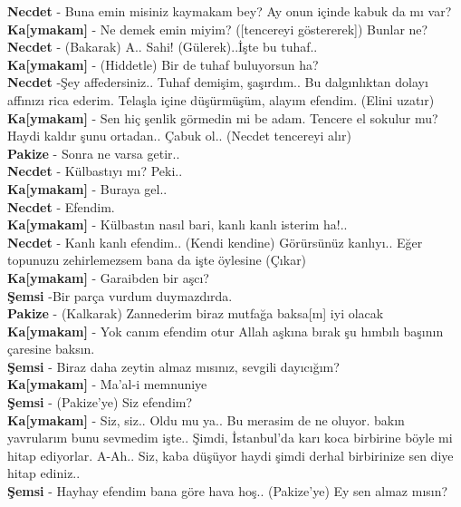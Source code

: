 \documentclass[]{book}
\begin{document}
\textbf{Necdet} - Buna emin misiniz kaymakam bey? Ay onun içinde kabuk da mı var?\\
\textbf{Ka{[}ymakam{]}} - Ne demek emin miyim? ({[}tencereyi göstererek{]}) Bunlar ne?\\
\textbf{Necdet} - (Bakarak) A.. Sahi! (Gülerek)..İşte bu tuhaf..\\
\textbf{Ka{[}ymakam{]}} - (Hiddetle) Bir de tuhaf buluyorsun ha?\\
\textbf{Necdet} -Şey affedersiniz.. Tuhaf demişim, şaşırdım.. Bu dalgınlıktan dolayı affınızı rica ederim. Telaşla içine düşürmüşüm, alayım efendim. (Elini uzatır)\\
\textbf{Ka{[}ymakam{]}} - Sen hiç şenlik görmedin mi be adam. Tencere el sokulur mu? Haydi kaldır şunu ortadan.. Çabuk ol..
(Necdet tencereyi alır)\\
\textbf{Pakize} - Sonra ne varsa getir..\\
\textbf{Necdet} - Külbastıyı mı? Peki..\\
\textbf{Ka{[}ymakam{]}} - Buraya gel..\\
\textbf{Necdet} - Efendim.\\
\textbf{Ka{[}ymakam{]}} - Külbastın nasıl bari, kanlı kanlı isterim ha!..\\
\textbf{Necdet} - Kanlı kanlı efendim.. (Kendi kendine) Görürsünüz kanlıyı.. Eğer topunuzu zehirlemezsem bana da işte öylesine (Çıkar)\\
\textbf{Ka{[}ymakam{]}} - Garaibden bir aşcı?\\
\textbf{Şemsi} -Bir parça vurdum duymazdırda.\\
\textbf{Pakize} - (Kalkarak) Zannederim biraz mutfağa baksa{[}m{]} iyi olacak\\
\textbf{Ka{[}ymakam{]}} - Yok canım efendim otur Allah aşkına bırak şu hımbılı başının çaresine baksın.\\
\textbf{Şemsi} - Biraz daha zeytin almaz mısınız, sevgili dayıcığım?\\
\textbf{Ka{[}ymakam{]}} - Ma'al-i memnuniye\\
\textbf{Şemsi} - (Pakize'ye) Siz efendim?\\
\textbf{Ka{[}ymakam{]}} - Siz, siz.. Oldu mu ya.. Bu merasim de ne oluyor. bakın yavrularım bunu sevmedim işte.. Şimdi, İstanbul'da karı koca birbirine böyle mi hitap ediyorlar. A-Ah.. Siz, kaba düşüyor haydi şimdi derhal birbirinize sen diye hitap ediniz..\\
\textbf{Şemsi} - Hayhay efendim bana göre hava hoş.. (Pakize'ye) Ey sen almaz mısın?\\
\end{document}
